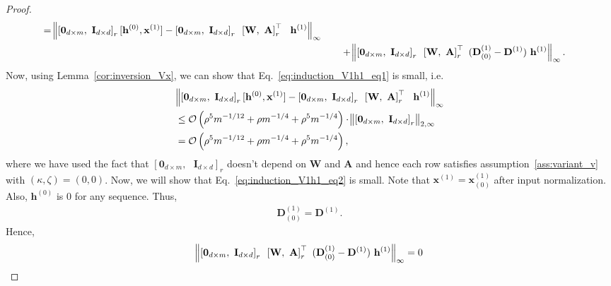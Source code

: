 \begin{proof}
\begin{align}
		= \norm{ \left[\mathbf{0}_{d \times m}, \text{ } \mathbf{I}_{d \times d}\right]_r [\mathbf{h}^{(0)}, \mathbf{x}^{(1)}] -  \left[\mathbf{0}_{d \times m}, \text{ } \mathbf{I}_{d \times d}\right]_r  \text{ } \left[\mathbf{W}, \text{ } \mathbf{A}\right]_r^{\top} \text{ } \text{ } \mathbf{h}^{(1)} }_\infty \label{eq:induction_V1h1_eq1}\\&
		\quad \quad  + \norm{\left[\mathbf{0}_{d \times m}, \text{ } \mathbf{I}_{d \times d}\right]_r  \text{ } \left[\mathbf{W}, \text{ } \mathbf{A}\right]_r^{\top} \text{ } (\mathbf{D}^{(1)}_{(0)} - \mathbf{D}^{(1)}) \text{ } \mathbf{h}^{(1)}}_\infty. \label{eq:induction_V1h1_eq2}
	\end{align}
	Now, using Lemma~\ref{cor:inversion_Vx}, we can show that Eq.~\ref{eq:induction_V1h1_eq1} is small, i.e. 
	\begin{align*}
		&\norm{ \left[\mathbf{0}_{d \times m}, \text{ } \mathbf{I}_{d \times d}\right]_r [\mathbf{h}^{(0)}, \mathbf{x}^{(1)}] -  \left[\mathbf{0}_{d \times m}, \text{ } \mathbf{I}_{d \times d}\right]_r  \text{ } \left[\mathbf{W}, \text{ } \mathbf{A}\right]_r^{\top} \text{ } \text{ } \mathbf{h}^{(1)}}_\infty  \\&\le \mathcal{O}\left(\rho^{5} m^{-1/12} + \rho m^{-1/4} + \rho^{5} m^{-1/4}  \right)  \cdot \norm{\left[\mathbf{0}_{d \times m}, \text{ } \mathbf{I}_{d \times d}\right]_r}_{2, \infty} \\&
		= \mathcal{O}\left(\rho^{5} m^{-1/12} + \rho m^{-1/4} + \rho^{5} m^{-1/4}  \right),
	\end{align*}
	where we have used the fact that $\left[\mathbf{0}_{d \times m}, \text{ } \mathbf{I}_{d \times d}\right]_r$ doesn't depend on $\mathbf{W}$ and $\mathbf{A}$ and hence each row satisfies assumption~\ref{ass:variant_v} with $(\kappa, \zeta)=(0, 0)$.
	Now, we will show that Eq.~\ref{eq:induction_V1h1_eq2} is small. Note that $\mathbf{x}^{(1)} = \mathbf{x}^{(1)}_{(0)}$ after input normalization. Also, $\mathbf{h}^{(0)}$ is $0$ for any sequence. Thus,
	\begin{align*}
		\mathbf{D}^{(1)}_{(0)} = \mathbf{D}^{(1)}.        
	\end{align*}
	Hence,
	\begin{align*}
		\norm{\left[\mathbf{0}_{d \times m}, \text{ } \mathbf{I}_{d \times d}\right]_r  \text{ } \left[\mathbf{W}, \text{ } \mathbf{A}\right]_r^{\top} \text{ } (\mathbf{D}^{(1)}_{(0)} - \mathbf{D}^{(1)}) \text{ } \mathbf{h}^{(1)}}_\infty = 0
	\end{align*}
	

\end{proof}
